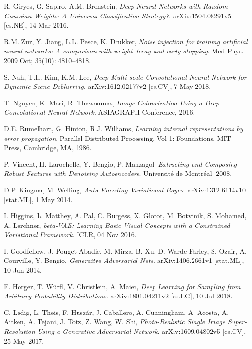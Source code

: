\documentclass[../main.tex]{subfiles}
\begin{document}
\begin{thebibliography}{999}
  R. Giryes, G. Sapiro, A.M. Bronstein,
  \emph{Deep Neural Networks with Random Gaussian Weights: A Universal Classification Strategy?}.
  arXiv:1504.08291v5 [cs.NE],
  14 Mar 2016.

  R.M. Zur, Y. Jiang, L.L. Pesce, K. Drukker,
  \emph{Noise injection for training artificial neural networks: A comparison with weight decay and early stopping}.
  Med Phys.
  2009 Oct;
  36(10): 4810–4818.

  S. Nah, T.H. Kim, K.M. Lee,
  \emph{Deep Multi-scale Convolutional Neural Network for Dynamic Scene Deblurring}.
  arXiv:1612.02177v2 [cs.CV],
  7 May 2018.

  T. Nguyen, K. Mori, R. Thawonmas,
  \emph{Image Colourization Using a Deep Convolutional Neural Network}.
  ASIAGRAPH Conference,
  2016.

  D.E. Rumelhart, G. Hinton, R.J. Williams,
  \emph{Learning internal representations by error propagation}.
  Parallel Distributed Processing,
  Vol 1: Foundations,
  MIT Press,
  Cambridge, MA,
  1986.

  P. Vincent, H. Larochelle, Y. Bengio, P. Manzagol,
  \emph{Extracting and Composing Robust Features with Denoising Autoencoders}.
  Universit\'e de Montr\'eal,
  2008.

  D.P. Kingma, M. Welling,
  \emph{Auto-Encoding Variational Bayes}.
  arXiv:1312.6114v10 [stat.ML],
  1 May 2014.

  I. Higgins, L. Matthey, A. Pal, C. Burgess, X. Glorot, M. Botvinik, S. Mohamed, A. Lerchner,
  \emph{beta-VAE: Learning Basic Visual Concepts with a Constrained Variational Framework}.
  ICLR,
  04 Nov 2016.

  I. Goodfellow, J. Pouget-Abadie, M. Mirza, B. Xu, D. Warde-Farley, S. Ozair, A. Courville, Y. Bengio,
  \emph{Generaitve Adversarial Nets}.
  arXiv:1406.2661v1 [stat.ML],
  10 Jun 2014.

  F. Horger, T. W\"urfl, V. Christlein, A. Maier,
  \emph{Deep Learning for Sampling from Arbitrary Probability Distributions}.
  arXiv:1801.04211v2 [cs.LG],
  10 Jul 2018.

  C. Ledig, L. Theis, F. Husz\'ar, J. Caballero, A. Cunningham, A. Acosta, A. Aitken, A. Tejani, J. Totz, Z. Wang, W. Shi,
  \emph{Photo-Realistic Single Image Super-Resolution Using a Generative Adversarial Network}.
  arXiv:1609.04802v5 [cs.CV],
  25 May 2017.


\end{thebibliography}
\end{document}
